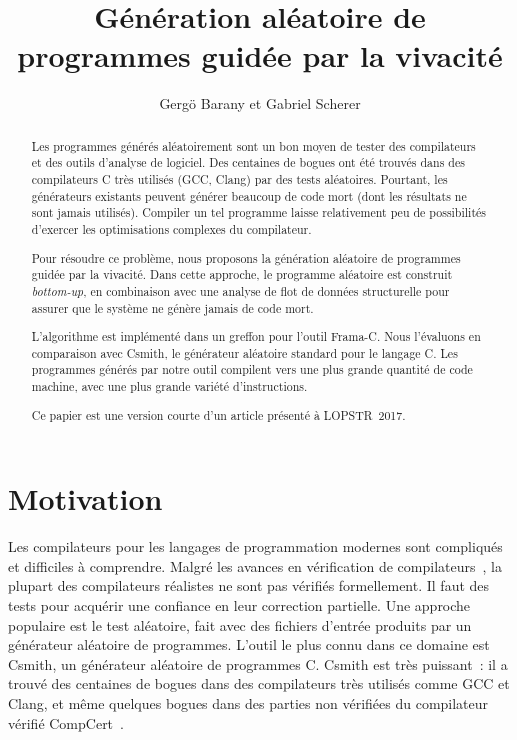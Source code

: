 \documentclass[a4paper]{easychair}
\title{Génération aléatoire de programmes guidée par la vivacité}
\author{Gergö Barany\inst{1} et Gabriel Scherer\inst{2}}
\institute{
Inria Paris \\
\email{gergo.barany@inria.fr}
\and
Inria Saclay \\
\email{gabriel.scherer@gmail.com}
}
\newcommand{\anglais}[1]{\textit{#1}}
\begin{document}
\maketitle
\thispagestyle{plain}

\begin{abstract}
Les programmes générés aléatoirement sont un bon moyen de tester des
compilateurs et des outils d'analyse de logiciel. Des centaines de bogues
ont été trouvés dans des compilateurs C très utilisés (GCC, Clang) par des
tests aléatoires. Pourtant, les générateurs existants peuvent générer
beaucoup de code mort (dont les résultats ne sont jamais utilisés). Compiler
un tel programme laisse relativement peu de possibilités d'exercer les
optimisations complexes du compilateur.

Pour résoudre ce problème, nous proposons la génération aléatoire de
programmes guidée par la vivacité. Dans cette approche, le programme aléatoire
est construit \anglais{bottom-up}, en combinaison avec une analyse de flot de
données structurelle pour assurer que le système ne génère jamais de code
mort.

L'algorithme est implémenté dans un greffon pour l'outil Frama-C. Nous
l'évaluons en comparaison avec Csmith, le générateur aléatoire standard pour
le langage C. Les programmes générés par notre outil compilent vers une plus
grande quantité de code machine, avec une plus grande variété
d'instructions.

Ce papier est une version courte d'un article présenté à LOPSTR~2017.
\end{abstract}



\section{Motivation}

Les compilateurs pour les langages de programmation modernes sont
compliqués et difficiles à comprendre. Malgré les avances en vérification de
compilateurs~\cite{leroy-2009,tan-2016}, la plupart des compilateurs
réalistes ne sont pas vérifiés formellement. Il faut des tests pour acquérir une confiance en leur correction partielle. Une approche populaire est le test aléatoire,
fait avec des fichiers d'entrée produits par un générateur aléatoire de
programmes. L'outil le plus connu dans ce domaine est Csmith, un générateur
aléatoire de programmes C. Csmith est très puissant~: il a trouvé des
centaines de bogues dans des compilateurs très utilisés comme GCC et Clang,
et même quelques bogues dans des parties non vérifiées du compilateur vérifié
CompCert~\cite{csmith-2011}.
\end{document}
